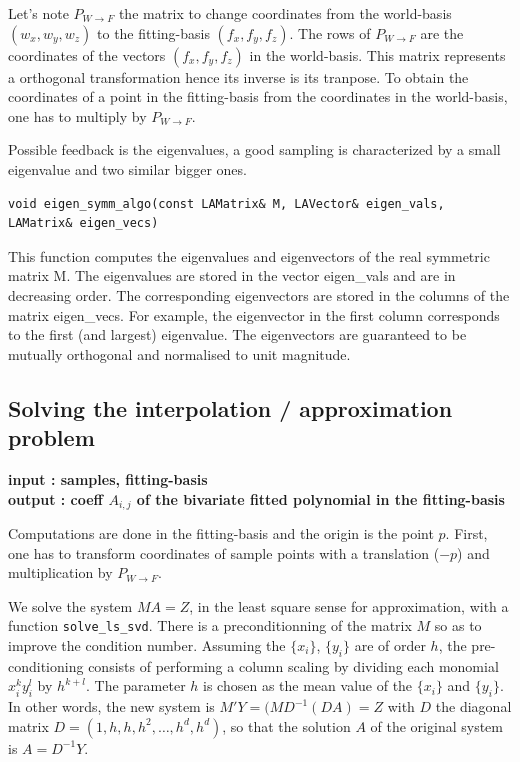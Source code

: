 Let's note $P_{W\rightarrow F}$ the matrix to change coordinates from the
world-basis $(w_x,w_y,w_z)$ to the fitting-basis $(f_x,f_y,f_z)$. The
rows of $P_{W\rightarrow F}$ are the coordinates of the vectors
$(f_x,f_y,f_z)$ in the world-basis. This matrix represents a
orthogonal transformation hence its inverse is its tranpose. To obtain
the coordinates of a point in the fitting-basis from the coordinates
in the world-basis, one has to multiply by $ P_{W\rightarrow F}$.

Possible feedback is the eigenvalues, a good sampling is characterized 
by a small eigenvalue and two similar bigger ones.


\begin{verbatim}
void eigen_symm_algo(const LAMatrix& M, LAVector& eigen_vals, LAMatrix& eigen_vecs)
\end{verbatim} 
This function computes the eigenvalues and eigenvectors of the real
symmetric matrix M. The eigenvalues are stored in the vector
eigen\_vals and are in decreasing order. The corresponding eigenvectors are
stored in the columns of the matrix eigen\_vecs. For example, the
eigenvector in the first column corresponds to the first (and largest)
eigenvalue. The eigenvectors are guaranteed to be mutually orthogonal
and normalised to unit magnitude.

\subsection{Solving the interpolation / approximation problem}
\label{sec:solving}

{\bf input : samples, fitting-basis \\ output : coeff $A_{i,j}$ of the
bivariate fitted polynomial in the fitting-basis }

Computations are done in the fitting-basis and the origin is the point
$p$. First, one has to transform coordinates of sample points with a
translation ($-p$) and multiplication by $ P_{W\rightarrow F}$.


We solve the system $MA=Z$, in the least square sense for
approximation, with a function {\tt solve\_ls\_svd}. There is a
preconditionning of the matrix $M$ so as to improve the condition
number. Assuming the $\{x_i\}$, $\{y_i\}$ are of order $h$, the
pre-conditioning consists of performing a column scaling by dividing
each monomial $x_i^ky_i^l$ by $h^{k+l}$. The parameter $h$ is chosen
as the mean value of the $\{x_i\}$ and $\{y_i\}$. In other words, the
new system is $M'Y=(MD^{-1}(DA)=Z$ with $D$ the diagonal matrix
$D=(1,h,h,h^2,\ldots,h^d,h^d)$, so that the solution $A$ of the
original system is $A=D^{-1}Y$.  


